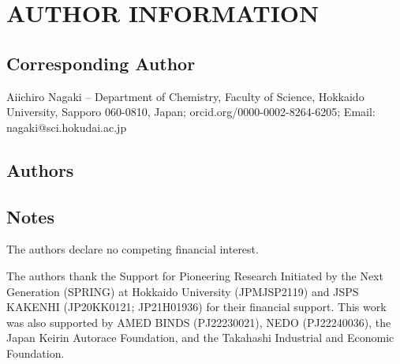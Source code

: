 \documentclass[journal=jcisd8,manuscript=article]{achemso}
\begin{document}
\section{AUTHOR INFORMATION}
\subsection{Corresponding Author}
Aiichiro Nagaki -- Department of Chemistry, Faculty of Science, Hokkaido University, Sapporo 060-0810, Japan; orcid.org/0000-0002-8264-6205; Email: nagaki@sci.hokudai.ac.jp

\subsection{Authors}




\subsection{Notes}
The authors declare no competing financial interest.


\begin{acknowledgement}%
The authors thank the Support for Pioneering Research Initiated by the Next Generation (SPRING) at Hokkaido University (JPMJSP2119) and JSPS KAKENHI (JP20KK0121; JP21H01936) for their financial support. 
This work was also supported by AMED BINDS (PJ22230021), NEDO (PJ22240036), the Japan Keirin Autorace Foundation, and the Takahashi Industrial and Economic Foundation.
\end{acknowledgement}




\end{document}
